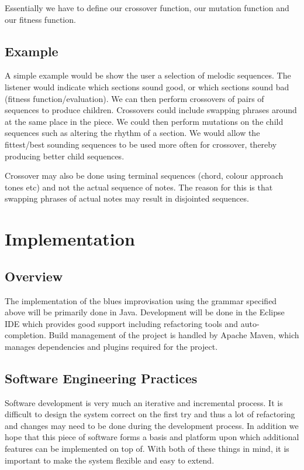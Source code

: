 \documentclass[pdftex,12pt,a4paper]{report}
\begin{document}
Essentially we have to define our crossover function, our mutation function and our fitness function.

\section{Example}
A simple example would be show the user a selection of melodic sequences. The listener would indicate which sections sound good, or which sections sound bad (fitness function/evaluation). We can then perform crossovers of pairs of sequences to produce children. Crossovers could include swapping phrases around at the same place in the piece. We could then perform mutations on the child sequences such as altering the rhythm of a section. We would allow the fittest/best sounding sequences to be used more often for crossover, thereby producing better child sequences.

Crossover may also be done using terminal sequences (chord, colour approach tones etc) and not the actual sequence of notes. The reason for this is that swapping phrases of actual notes may result in disjointed sequences.

\chapter{Implementation}

\section{Overview}
The implementation of the blues improvisation using the grammar specified above will be primarily done in Java. Development will be done in the Eclipse IDE which provides good support including refactoring tools and auto-completion. Build management of the project is handled by Apache Maven, which manages dependencies and plugins required for the project. 

\section{Software Engineering Practices}
Software development is very much an iterative and incremental process. It is difficult to design the system correct on the first try and thus a lot of refactoring and changes may need to be done during the development process. In addition we hope that this piece of software forms a basis and platform upon which additional features can be implemented on top of. With both of these things in mind, it is important to make the system flexible and easy to extend. 
\end{document}
